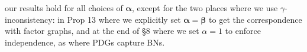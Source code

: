 \documentclass{article}
\theoremstyle{plain}
\theoremstyle{definition}
\newcommand{\mat}[1]{\mathbf{#1}}
\newcommand{\balpha}{\boldsymbol\alpha}
\newcommand{\bbeta}{\boldsymbol\beta}
\newcommand{\IDef}[1]{\mathit{IDef}_{\!#1}}
\begin{document}
our results hold for all choices of $\balpha$, except for the two places where we use $\gamma$-inconsistency: in Prop 13 where we explicitly set $\balpha \!=\! \bbeta$ to get the correspondence with factor graphs, and at the end of \S8 where we set $\alpha \!=\! 1$ to enforce independence, as where PDGs capture BNs.
%
%




\end{document}
